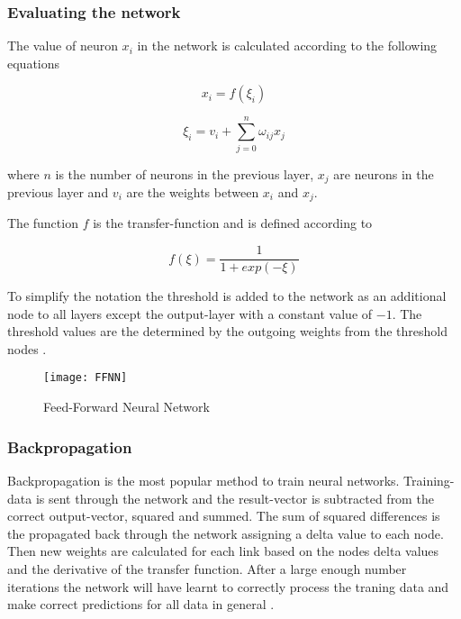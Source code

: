 \subsubsection{Evaluating the network}

The value of neuron $x_i$ in the network is calculated according to the following equations

\begin{equation}
  x_i = f(\xi_i)
  \label{neuron}
\end{equation}

\begin{equation}
  \xi_i = v_i + \sum_{j = 0}^{n} {\omega_{ij}x_{j}}
  \label{neuron_sum}
\end{equation}

\noindent
where $n$ is the number of neurons in the previous layer, $x_j$ are neurons in the previous layer and $v_i$ are the weights between $x_i$ and $x_j$.

The function $f$ is the transfer-function and is defined according to

\begin{equation}
  f(\xi) = \frac {1} {1 + exp(-\xi)}
\end{equation}

To simplify the notation the threshold is added to the network as an additional node to all layers except the output-layer with a constant value of $-1$. The threshold values are the determined by the outgoing weights from the threshold nodes \cite{svozil1997introduction}.



\begin{figure}[H]
  \centering
    \texttt{[image: FFNN]}
  \caption{Feed-Forward Neural Network}
  \label{figure:FFNN}
\end{figure}


\subsubsection{Backpropagation}

Backpropagation is the most popular method to train neural networks. Training-data is sent through the network and the result-vector is subtracted from the correct output-vector, squared and summed. The sum of squared differences is the propagated back through the network assigning a delta value to each node. Then new weights are calculated for each link based on the nodes delta values and the derivative of the transfer function. After a large enough number iterations the network will have learnt to correctly process the traning data and make correct predictions for all data in general \cite{engelbrecht2007computational}.
